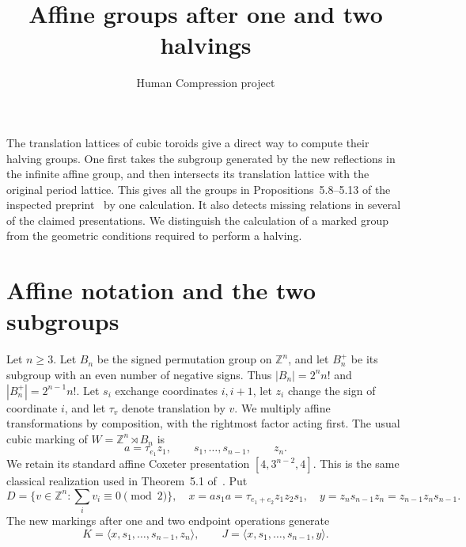\documentclass[11pt,a4paper]{article}
\title{Affine groups after one and two halvings}
\author{Human Compression project}
\date{}
\newcommand{\Z}{\mathbb Z}
\newcommand{\gen}[1]{\langle #1\rangle}
\begin{document}
\maketitle

The translation lattices of cubic toroids give a direct way to compute
their halving groups. One first takes the subgroup generated by the
new reflections in the infinite affine group, and then intersects its
translation lattice with the original period lattice. This gives all
the groups in Propositions~5.8--5.13 of the inspected preprint~\cite{PT}
by one calculation. It also detects missing relations in several of
the claimed presentations. We distinguish the calculation of a marked
group from the geometric conditions required to perform a halving.

\section{Affine notation and the two subgroups}
Let $n\ge3$. Let $B_n$ be the signed permutation group on $\Z^n$,
and let $B_n^+$ be its subgroup with an even number of negative signs.
Thus $|B_n|=2^nn!$ and $|B_n^+|=2^{n-1}n!$.
Let $s_i$ exchange coordinates $i,i+1$, let $z_i$ change the sign
of coordinate $i$, and let $\tau_v$ denote translation by $v$.
We multiply affine transformations by composition, with the rightmost
factor acting first. The usual cubic marking of
$W=\Z^n\rtimes B_n$ is
\[
 a=\tau_{e_1}z_1,\qquad s_1,\ldots,s_{n-1},\qquad z_n.
\]
We retain its standard affine Coxeter presentation
$[4,3^{n-2},4]$. This is the same classical realization used in
Theorem~5.1 of~\cite{PT}. Put
\[
 D=\{v\in\Z^n:\textstyle\sum_i v_i\equiv0\pmod2\},\quad
 x=as_1a=\tau_{e_1+e_2}z_1z_2s_1,\quad
 y=z_ns_{n-1}z_n=z_{n-1}z_ns_{n-1}.
\]
The new markings after one and two endpoint operations generate
\[
 K=\gen{x,s_1,\ldots,s_{n-1},z_n},\qquad
 J=\gen{x,s_1,\ldots,s_{n-1},y}.
\]
\end{document}
